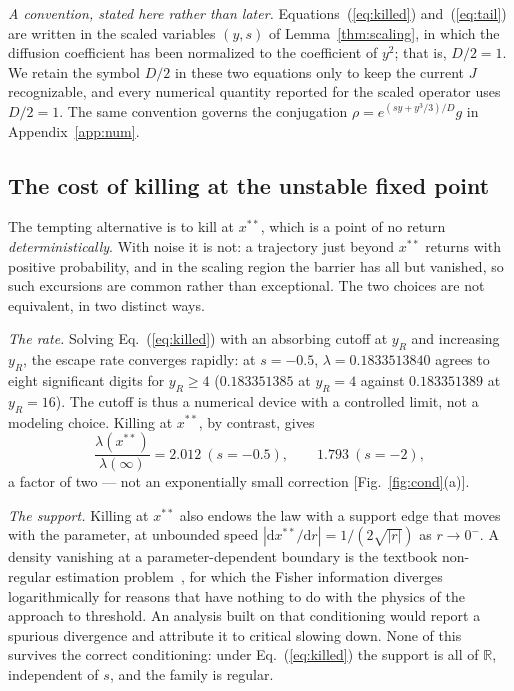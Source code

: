\documentclass[%
 twocolumn,
 superscriptaddress,
 amsmath,amssymb,
 aps,
 pre,
 floatfix,
]{revtex4-2}
\newcommand{\dd}{\mathrm{d}}
\begin{document}
\emph{A convention, stated here rather than later.}  Equations~(\ref{eq:killed}) and~(\ref{eq:tail}) are written in the scaled variables $(y,s)$ of Lemma~\ref{thm:scaling}, in which the diffusion coefficient has been normalized to the coefficient of $y^2$; that is, $D/2=1$.  We retain the symbol $D/2$ in these two equations only to keep the current $J$ recognizable, and every numerical quantity reported for the scaled operator uses $D/2=1$.  The same convention governs the conjugation $\rho=e^{(sy+y^3/3)/D}g$ in Appendix~\ref{app:num}.

\subsection{The cost of killing at the unstable fixed point}

The tempting alternative is to kill at $x^{\ast\ast}$, which is a point of no return \emph{deterministically}.  With noise it is not: a trajectory just beyond $x^{\ast\ast}$ returns with positive probability, and in the scaling region the barrier has all but vanished, so such excursions are common rather than exceptional.  The two choices are not equivalent, in two distinct ways.

\emph{The rate.}  Solving Eq.~(\ref{eq:killed}) with an absorbing cutoff at $y_R$ and increasing $y_R$, the escape rate converges rapidly: at $s=-0.5$, $\lambda=0.1833513840$ agrees to eight significant digits for $y_R\ge4$ ($0.183351385$ at $y_R=4$ against $0.183351389$ at $y_R=16$).  The cutoff is thus a numerical device with a controlled limit, not a modeling choice.  Killing at $x^{\ast\ast}$, by contrast, gives
\begin{equation}
\label{eq:xssratio}
\frac{\lambda(x^{\ast\ast})}{\lambda(\infty)}=2.012\ (s=-0.5),\qquad 1.793\ (s=-2),
\end{equation}
a factor of two --- not an exponentially small correction [Fig.~\ref{fig:cond}(a)].

\emph{The support.}  Killing at $x^{\ast\ast}$ also endows the law with a support edge that moves with the parameter, at unbounded speed $|\dd x^{\ast\ast}/\dd r|=1/(2\sqrt{|r|})$ as $r\to0^-$.  A density vanishing at a parameter-dependent boundary is the textbook non-regular estimation problem~\cite{IbragimovHasminskii,AkahiraTakeuchi}, for which the Fisher information diverges logarithmically for reasons that have nothing to do with the physics of the approach to threshold.  An analysis built on that conditioning would report a spurious divergence and attribute it to critical slowing down.  None of this survives the correct conditioning: under Eq.~(\ref{eq:killed}) the support is all of $\mathbb{R}$, independent of $s$, and the family is regular.
\end{document}
